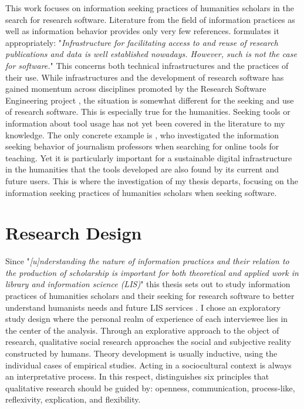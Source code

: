 \documentclass[12pt, a4paper, titlepage, oneside, abstract=true, toc=listof, toc=bibliography, BCOR=1cm]{scrreprt}
\begin{document}
This work focuses on information seeking practices of humanities scholars in the search for research software. Literature from the field of information practices as well as information behavior provides only very few references. \citet[p. 231]{Buddenbohm2017} formulates it appropriately: "\textit{Infrastructure for facilitating access to and reuse of research publications and data is well established nowadays. However, such is not the case for software.}" This concerns both technical infrastructures and the practices of their use. While infrastructures and the development of research software has gained momentum across disciplines promoted by the Research Software Engineering project \citep{Baxter2012}, the situation is somewhat different for the seeking and use of research software. This is especially true for the humanities. Seeking tools or information about tool usage has not yet been covered in the literature to my knowledge. The only concrete example is \citet{Hepworth2017}, who investigated the information seeking behavior of journalism professors when searching for online tools for teaching. Yet it is particularly important for a sustainable digital infrastructure in the humanities \citep{Neuefeind2020} that the tools developed are also found by its current and future users. This is where the investigation of my thesis departs, focusing on the information seeking practices of humanities scholars when seeking software.
	
\chapter{Research Design}
\label{sec:RD}
Since "\textit{[u]nderstanding the nature of information practices and their relation to the production of scholarship is important for both theoretical and applied work in library and information science (LIS)}" \citep[p. 165]{Palmer2009} this thesis sets out to study information practices of humanities scholars and their seeking for research software to better understand humanists needs and future LIS services \citep{Case2008, Cunningham2010}. I chose an exploratory study design \citep{Rinsdorf2013} where the personal realm of experience of each interviewee lies in the center of the analysis. Through an explorative approach to the object of research, qualitative social research approaches the social and subjective reality constructed by humans. Theory development is usually inductive, using the individual cases of empirical studies. Acting in a sociocultural context is always an interpretative process. In this respect, \citet[p. 20ff]{Lamnek2005} distinguishes six principles that qualitative research should be guided by: openness, communication, process-like, reflexivity, explication, and flexibility.
\end{document}

